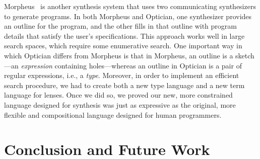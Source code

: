 \documentclass{svproc}
\begin{document}
Morpheus~\cite{morpheus} is another synthesis system that uses two
communicating synthesizers to generate programs.  In both Morpheus and
Optician, one synthesizer provides an 
outline for the program, and the other fills in that outline with program
details that satisfy the user's specifications.
This approach works well in large search spaces, which
require some enumerative search.
One important way in which Optician differs from Morpheus is that in
Morpheus, an outline is a sketch---an
\emph{expression}
containing holes---whereas
an outline in Optician is a pair of regular
expressions, i.e., a 
\emph{type}.  Moreover, in order to implement an efficient
search procedure, we had to create both a new type language and a new
term language for lenses.  Once we did so, we proved our new, more
constrained language
designed for synthesis was just as expressive as the original, more
flexible and compositional language designed for human programmers.


\section{Conclusion and Future Work}
\label{concl}


\end{document}
